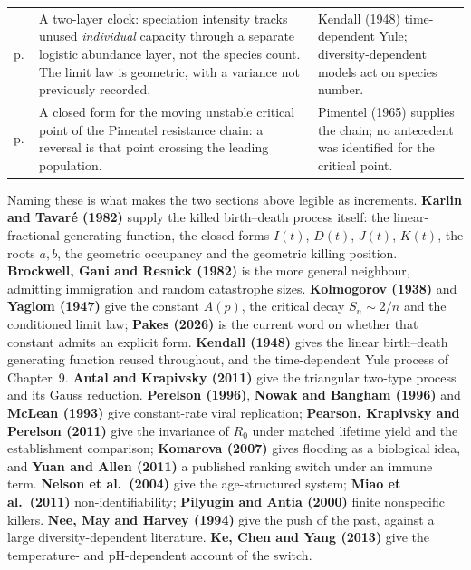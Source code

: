 {\begin{xltabular}{\linewidth}{@{}>{\raggedright\arraybackslash}p{20mm}O>{\raggedright\arraybackslash}p{40mm}@{}}
\newline p.\,\pageref{var:cor:logistic-limit} &
A two-layer clock: speciation intensity tracks unused \emph{individual} capacity through a
separate logistic abundance layer, not the species count. The limit law is geometric, with
a variance not previously recorded. &
Kendall (1948) time-dependent Yule; diversity-dependent models act on species number. \\
\addlinespace[3pt]

\newline p.\,\pageref{var:eq:icrit} &
A closed form for the moving unstable critical point of the Pimentel resistance chain: a
reversal is that point crossing the leading population. &
Pimentel (1965) supplies the chain; no antecedent was identified for the critical point. \\
\end{xltabular}\par}


{\footnotesize\noindent
Naming these is what makes the two sections above legible as increments.
\textbf{Karlin and Tavar\'e (1982)} supply the killed birth--death process itself: the
linear-fractional generating function, the closed forms $I(t)$, $D(t)$, $J(t)$, $K(t)$, the
roots $a,b$, the geometric occupancy and the geometric killing position. \textbf{Brockwell,
Gani and Resnick (1982)} is the more general neighbour, admitting immigration and random
catastrophe sizes. \textbf{Kolmogorov (1938)} and \textbf{Yaglom (1947)} give the constant
$A(p)$, the critical decay $S_n\sim2/n$ and the conditioned limit law; \textbf{Pakes (2026)}
is the current word on whether that constant admits an explicit form.
\textbf{Kendall (1948)} gives the linear birth--death generating function reused throughout,
and the time-dependent Yule process of Chapter~9. \textbf{Antal and Krapivsky (2011)} give
the triangular two-type process and its Gauss reduction. \textbf{Perelson (1996)}, \textbf{Nowak
and Bangham (1996)} and \textbf{McLean (1993)} give constant-rate viral replication;
\textbf{Pearson, Krapivsky and Perelson (2011)} give the invariance of $R_0$ under matched
lifetime yield and the establishment comparison; \textbf{Komarova (2007)} gives flooding as a
biological idea, and \textbf{Yuan and Allen (2011)} a published ranking switch under an immune
term. \textbf{Nelson et al.\ (2004)} give the age-structured system; \textbf{Miao et al.\
(2011)} non-identifiability; \textbf{Pilyugin and Antia (2000)} finite nonspecific killers.
\textbf{Nee, May and Harvey (1994)} give the push of the past, against a large
diversity-dependent literature. \textbf{Ke, Chen and Yang (2013)} give the temperature- and
pH-dependent account of the \yp{} switch.\par}


